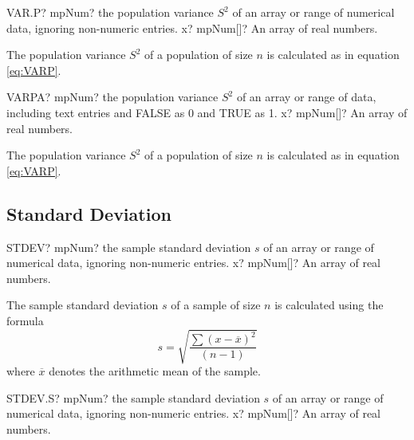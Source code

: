\vspace{0.6cm}
\begin{mpFunctionsExtract}
	\mpWorksheetFunctionOneNotImplemented
	{VAR.P? mpNum? the population variance $S^2$ of an array or range of numerical data, ignoring non-numeric entries.}
	{x? mpNum[]? An array of real numbers.}
\end{mpFunctionsExtract}

The population variance $S^2$ of a population of size $n$ is calculated as in equation \ref{eq:VARP}.



\vspace{0.6cm}
\begin{mpFunctionsExtract}
	\mpWorksheetFunctionOneNotImplemented
	{VARPA? mpNum? the population variance $S^2$ of an array or range of data, including text entries and FALSE as 0 and TRUE as 1.}
	{x? mpNum[]? An array of real numbers.}
\end{mpFunctionsExtract}

The population variance $S^2$ of a population of size $n$ is calculated as in equation \ref{eq:VARP}.






\subsection{Standard Deviation}


\begin{mpFunctionsExtract}
	\mpWorksheetFunctionOneNotImplemented
	{STDEV? mpNum? the sample standard deviation $s$ of an array or range of numerical data, ignoring non-numeric entries.}
	{x? mpNum[]? An array of real numbers.}
\end{mpFunctionsExtract}

The sample standard deviation $s$ of a sample of size $n$ is calculated using the formula
\begin{equation}  \label{eq:STDEV}
	s = \sqrt{\frac{\sum (x-\overline{x})^2}{(n-1)}}  
\end{equation}
where $\overline{x}$ denotes the arithmetic mean of the sample.



\vspace{0.6cm}
\begin{mpFunctionsExtract}
	\mpWorksheetFunctionOneNotImplemented
	{STDEV.S? mpNum? the sample standard deviation $s$ of an array or range of numerical data, ignoring non-numeric entries.}
	{x? mpNum[]? An array of real numbers.}
\end{mpFunctionsExtract}

